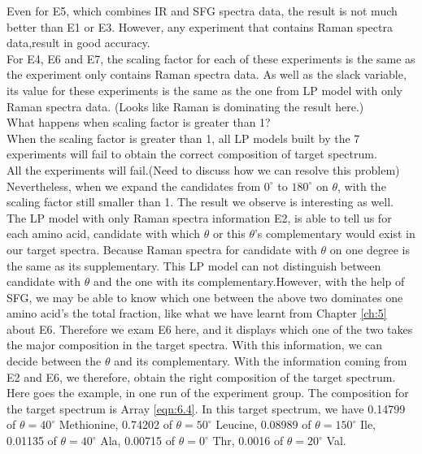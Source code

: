 Even for E5, which combines IR and SFG spectra data, the result is not much better than E1 or E3. However, any experiment that contains Raman spectra data,result in good accuracy. \\


For E4, E6 and E7, the scaling factor for each of these experiments is the same as the experiment only contains Raman spectra data. As well as the slack variable, its value for these experiments is the same as the one from LP model with only Raman spectra data. (Looks like Raman is dominating the result here.) \\
What happens when scaling factor is greater than 1?\\
When the scaling factor is greater than 1, all LP models built by the 7 experiments will fail to obtain the correct composition of target spectrum.\\
All the experiments will fail.(Need to discuss how we can resolve this problem)\\

Nevertheless, when we expand the candidates from $0^{\circ}$ to $180^{\circ}$ on $\theta$, with the scaling factor still smaller than 1. The result we observe is interesting as well.\\

The LP model with only Raman spectra information E2, is able to tell us for each amino acid, candidate with which $\theta$ or this $\theta$'s complementary would exist in our target spectra. Because Raman spectra for candidate with $\theta$ on one degree is the same as its supplementary. This LP model can not distinguish between candidate with $\theta$ and the one with its complementary.However, with the help of SFG, we may be able to know which one between the above two dominates one amino acid's the total fraction, like what we have learnt from Chapter \ref{ch:5} about E6. Therefore we exam E6 here, and it displays which one of the two takes the major composition in the target spectra. With this information, we can decide between the $\theta$ and its complementary. 
With the information coming from E2 and E6, we therefore, obtain the right composition of the target spectrum.\\

Here goes the example, in one run of the experiment group. The composition for the target spectrum is Array \ref{eqn:6.4}. %
In this target spectrum, we have 0.14799 of $\theta = 40^{\circ}$ Methionine, 0.74202 of $\theta = 50^{\circ}$ Leucine, 0.08989 of $\theta = 150^{\circ}$ Ile, 0.01135 of $\theta = 40^{\circ}$ Ala, 0.00715 of $\theta = 0^{\circ}$ Thr, 0.0016 of $\theta = 20^{\circ}$ Val. 

